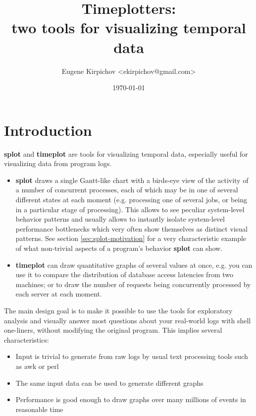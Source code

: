 \documentclass{article}
\begin{document}
\title{Timeplotters:\\
two tools for visualizing temporal data}
\author{Eugene Kirpichov <ekirpichov@gmail.com>}
\date{\today}
\maketitle

\tableofcontents

\def\splot{\textbf{splot}}
\def\timeplot{\textbf{timeplot}}

\setlength{\parskip}{2mm plus1mm minus1mm}

\section{Introduction}

\splot{} and \timeplot{} are tools for visualizing temporal data, especially useful for visualizing data from program logs.

\begin{itemize}
\item \splot{} draws a single Gantt-like chart with a birds-eye view of the activity of a number of concurrent processes, each of which may be in one of several different states at each moment (e.g. processing one of several jobs, or being in a particular stage of processing). This allows to see peculiar system-level behavior patterns and usually allows to instantly isolate system-level performance bottlenecks which very often show themselves as distinct visual patterns. See section \ref{sec:splot-motivation} for a very characteristic example of what non-trivial aspects of a program's behavior \splot{} can show.
\item \timeplot{} can draw quantitative graphs of several values at once, e.g. you can use it to compare the distribution of database access latencies from two machines; or to draw the number of requests being concurrently processed by each server at each moment.
\end{itemize}

The main design goal is to make it possible to use the tools for exploratory analysis and visually answer most questions about your real-world logs with shell one-liners, without modifying the original program. This implies several characteristics:

\begin{itemize}
\item Input is trivial to generate from raw logs by usual text processing tools such as awk or perl
\item The same input data can be used to generate different graphs
\item Performance is good enough to draw graphs over many millions of events in reasonable time
\end{itemize} 
\end{document}
